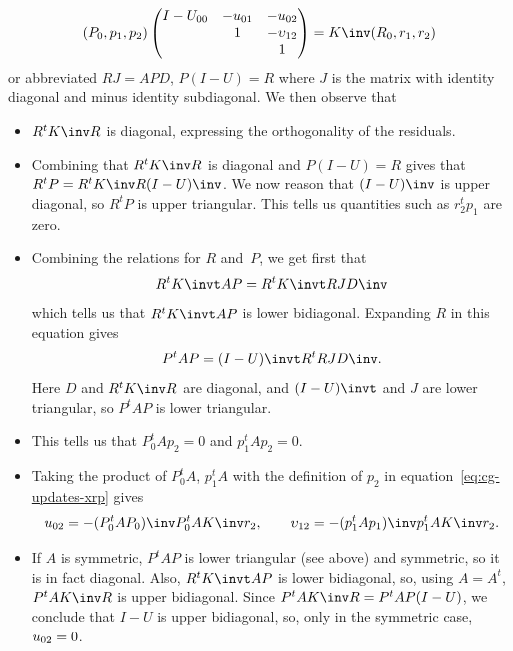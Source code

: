 \[ (P_0,p_1,p_2)
\begin{pmatrix}
  I-U_{00}&-u_{01}&-u_{02}\\ &1&-\upsilon_{12}\\ &&1
\end{pmatrix}
= K\inv (R_0,r_1,r_2)
\]
or abbreviated $RJ=APD$, $P(I-U)=R$ where $J$ is the matrix with
identity diagonal and minus identity subdiagonal. We then observe that
\begin{itemize}
\item $R^tK\inv R$ is diagonal, expressing the orthogonality of the
  residuals.
\item Combining that $R^tK\inv R$ is diagonal and $P(I-U)=R$ gives that
  $R^tP=R^tK\inv R(I-U)\inv$. We now reason that $(I-U)\inv$ is upper
  diagonal, so $R^tP$ is upper triangular. This tells us quantities
  such as $r_2^tp_1$ are zero.
\item Combining the relations for $R$ and~$P$, we get first that
  \[ R^tK\invt AP = R^tK\invt RJD\inv \]
  which tells us that $R^tK\invt AP$ is lower bidiagonal. Expanding $R$ in
  this equation gives
  \[ P^tAP = (I-U)\invt R^tR JD\inv.\]
  Here $D$ and $R^tK\inv R$ are diagonal, and $(I-U)\invt$ and $J$ are lower
  triangular, so $P^tAP$ is lower triangular.
\item This tells us that $P_0^tAp_2=0$ and $p_1^tAp_2=0$.
\item Taking the product of $P_0^tA$, $p_1^tA$ with the definition of
  $p_2$ in equation~\eqref{eq:cg-updates-xrp} gives
  \[ 
     u_{02} = -(P_0^tAP_0)\inv P_0^tAK\inv r_2, \qquad
     \upsilon_{12} = -(p_1^tAp_1)\inv p_1^tAK\inv r_2.
  \]
\item If $A$ is symmetric, $P^tAP$ is lower triangular (see above) and
  symmetric, so it is in fact diagonal. Also, $R^tK\invt AP$ is lower
  bidiagonal, so, using $A=A^t$, $P^tAK\inv R$ is upper bidiagonal. Since
  $P^tAK\inv R=P^tAP(I-U)$, we conclude that $I-U$ is upper bidiagonal, so,
  only in the symmetric case,~$u_{02}=\nobreak 0$.
\end{itemize}

